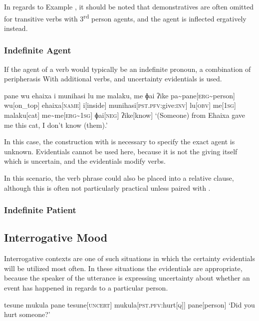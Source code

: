 In regards to Example , it should be noted that demonstratives are often omitted for transitive verbs with 3\textsuperscript{rd} person agents, and the agent is inflected ergatively instead.

\subsubsection{Indefinite Agent}
If the agent of a verb would typically be an indefinite pronoun, a combination of peripherasis With additional verbs, and uncertainty evidentials is used.

\ex
\begingl
\glpreamble pane wu ehaixa i munihasi lu me malaku, me ɸai ʔike
\endpreamble
\nogloss{\lbrack}
pa\textasciitilde pane[\textsc{erg\textasciitilde}person]
wu[on\_top]
ehaixa[\textsc{name}]
i[inside]
munihasi[\textsc{pst.pfv}:give\textsc{:inv}]
lu[\textsc{obv}]
me[\textsc{1sg}]
malaku[cat]
\nogloss{\rbrack}
me\textasciitilde me[\textsc{erg\textasciitilde 1sg}]
ɸai[\textsc{neg}]
ʔike[know]
\glft `(Someone) from Ehaixa gave me this cat, I don't know (them).'
\endgl
\xe

In this case, the construction with  is necessary to specify the exact agent is unknown.
Evidentials cannot be used here, because it is not the giving itself which is uncertain, and the evidentials modify verbs.

In this scenario, the verb phrase could also be placed into a relative clause, although this is often not particularly practical unless paired with .
\subsubsection{Indefinite Patient}
\subsection{Interrogative Mood}
Interrogative contexts are one of such situations in which the certainty evidentials will be utilized most often.
In these situations the evidentials are appropriate, because the speaker of the utterance is expressing uncertainty about whether an event has happened in regards to a particular person.

\ex
\begingl
\glpreamble tesune mukula pane
\endpreamble
tesune[\textsc{uncert}]
mukula[\textsc{pst.pfv:}hurt\textsc{[q]}]
pane[person]
\glft `Did you hurt someone?'
\endgl
\xe

